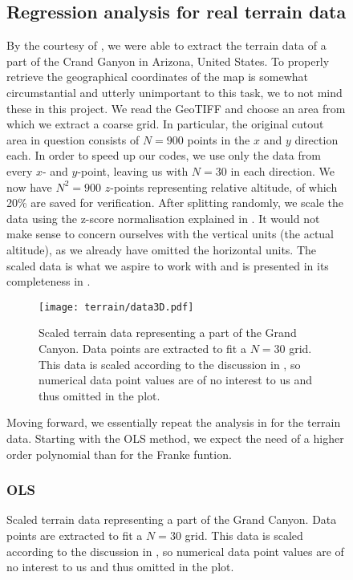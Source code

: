 \begin{figure}

        \clearpage

    \newpage

    \subsection{Regression analysis for real terrain data}\label{sec:reganalysis_real_data}

    By the courtesy of \citep{EarthExplorer}, we were able to extract the terrain data of a part of the Crand Ganyon in Arizona, United States. To properly retrieve the geographical coordinates of the map is somewhat circumstantial and utterly unimportant to this task, we to not mind these in this project. We read the GeoTIFF and choose an area from which we extract a coarse grid. In particular, the original cutout area in question consists of $N=900$ points in the $x$ and $y$ direction each. In order to speed up our codes, we use only the data from every  $x$- and $y$-point, leaving us with $N=30$ in each direction. We now have $N^2=900$ $z$-points representing relative altitude, of which 20\% are saved for verification. After splitting randomly, we scale the data using the z-score normalisation explained in . It would not make sense to concern ourselves with the vertical units (the actual altitude), as we already have omitted the horizontal units. The scaled data is what we aspire to work with and is presented in its completeness in .

    \begin{figure}
        \texttt{[image: terrain/data3D.pdf]}
        \caption{Scaled terrain data representing a part of the Grand Canyon. Data points are extracted to fit a $N=30$ grid. This data is scaled according to the discussion in , so numerical data point values are of no interest to us and thus omitted in the plot.}
        \label{fig:gc_data}
    \end{figure}

    Moving forward, we essentially repeat the analysis in  for the terrain data. Starting with the OLS method, we expect the need of a higher order polynomial than for the Franke funtion.

        \subsubsection{OLS}\label{sec:gc_olsanalysis}


\end{figure}
